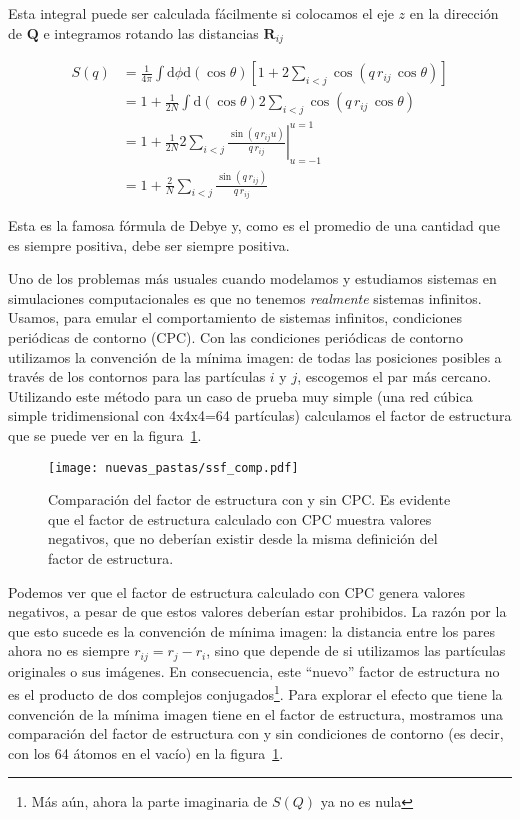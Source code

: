 Esta integral puede ser calculada fácilmente si colocamos el eje $z$ en la dirección de $\mathbf{Q}$ e integramos rotando las distancias $\mathbf{R}_{ij}$

\begin{align*}
  S(q) &= \frac{1}{4\pi}\int\text{d}\phi\text{d}(\cos\theta)
  \left[1 + 2\sum_{i < j}\cos\left(q\,r_{ij}\,\cos\theta\right)\right]\\
  &= 1 + \frac{1}{2N}\int\text{d}(\cos\theta)
  2\sum_{i < j}\cos\left(q\,r_{ij}\,\cos\theta\right)\\
  &= 1 + \frac{1}{2N} 2 \sum_{i < j} \left.\frac{\sin(q\,r_{ij}u)}{q\,r_{ij}}\right|_{u=-1}^{u=1}\\
  &= 1 + \frac{2}{N} \sum_{i < j}\frac{\sin(q\,r_{ij})}{q\,r_{ij}}
\end{align*}

Esta es la famosa fórmula de Debye y, como es el promedio de una cantidad que es siempre positiva, debe ser siempre positiva.

Uno de los problemas más usuales cuando modelamos y estudiamos sistemas en simulaciones computacionales es que no tenemos \emph{realmente} sistemas infinitos.
Usamos, para emular el comportamiento de sistemas infinitos, condiciones periódicas de contorno (CPC).
Con las condiciones periódicas de contorno utilizamos la convención de la mínima imagen: de todas las posiciones posibles a través de los contornos para las partículas $i$ y $j$, escogemos el par más cercano.
Utilizando este método para un caso de prueba muy simple (una red cúbica simple tridimensional con 4x4x4=64 partículas) calculamos el factor de estructura que se puede ver en la figura~\ref{fig:ssf_comp}.

\begin{figure}
  \centering
  \texttt{[image: nuevas\_pastas/ssf\_comp.pdf]}
  \caption{Comparación del factor de estructura con y sin CPC.
    Es evidente que el factor de estructura calculado con CPC muestra valores negativos, que no deberían existir desde la misma definición del factor de estructura.}
  \label{fig:ssf_comp}
\end{figure}

Podemos ver que el factor de estructura calculado con CPC genera valores negativos, a pesar de que estos valores deberían estar prohibidos.
La razón por la que esto sucede es la convención de mínima imagen: la distancia entre los pares ahora no es siempre $r_{ij} = r_j - r_i$, sino que depende de si utilizamos las partículas originales o sus imágenes.
En consecuencia, este ``nuevo'' factor de estructura no es el producto de dos complejos conjugados\footnote{Más aún, ahora la parte imaginaria de $S(Q)$ ya no es nula}.
Para explorar el efecto que tiene la convención de la mínima imagen tiene en el factor de estructura, mostramos una comparación del factor de estructura con y sin condiciones de contorno (es decir, con los 64 átomos en el vacío) en la figura~\ref{fig:ssf_comp}.

